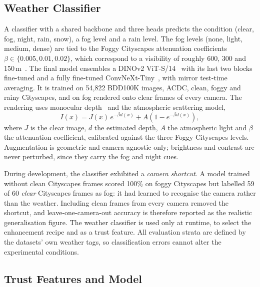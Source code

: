 \documentclass[pdflatex,sn-mathphys-num]{sn-jnl}
\begin{document}
\subsection{Weather Classifier}

A classifier with a shared backbone and three heads predicts the condition (clear, fog, night, rain, snow), a fog level and a rain level. The fog levels (none, light, medium, dense) are tied to the Foggy Cityscapes attenuation coefficients $\beta \in \{0.005, 0.01, 0.02\}$, which correspond to a visibility of roughly 600, 300 and 150\,m~\cite{sakaridis2018foggy}. The final model ensembles a DINOv2 ViT-S/14~\cite{oquab2024dinov2} with its last two blocks fine-tuned and a fully fine-tuned ConvNeXt-Tiny~\cite{liu2022convnext}, with mirror test-time averaging. It is trained on 54,822 BDD100K images, ACDC, clean, foggy and rainy Cityscapes, and on fog rendered onto clear frames of every camera. The rendering uses monocular depth~\cite{yang2024depthv2} and the atmospheric scattering model,
\begin{equation}
I(x) = J(x)\,e^{-\beta d(x)} + A\left(1 - e^{-\beta d(x)}\right),
\label{eq:fog}
\end{equation}
where $J$ is the clear image, $d$ the estimated depth, $A$ the atmospheric light and $\beta$ the attenuation coefficient, calibrated against the three Foggy Cityscapes levels. Augmentation is geometric and camera-agnostic only; brightness and contrast are never perturbed, since they carry the fog and night cues.

During development, the classifier exhibited a \emph{camera shortcut}. A model trained without clean Cityscapes frames scored 100\% on foggy Cityscapes but labelled 59 of 60 \emph{clear} Cityscapes frames as fog: it had learned to recognise the camera rather than the weather. Including clean frames from every camera removed the shortcut, and leave-one-camera-out accuracy is therefore reported as the realistic generalisation figure. The weather classifier is used only at runtime, to select the enhancement recipe and as a trust feature. All evaluation strata are defined by the datasets' own weather tags, so classification errors cannot alter the experimental conditions.

\subsection{Trust Features and Model}\label{sec:trust}
\end{document}
